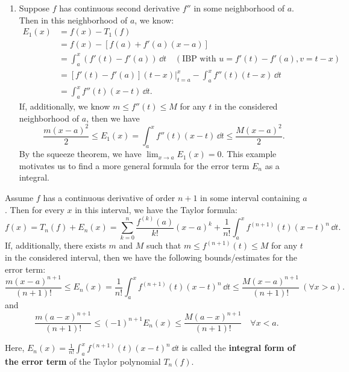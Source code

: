     \begin{exampleenv}
        \begin{enumerate}[label=(\arabic*),start=8]
            \item Suppose $f$ has continuous second derivative $f''$ in some neighborhood of $a$. Then in this neighborhood of $a$, we know:
            \[
            \begin{aligned}
                E_1(x) &= f(x) - T_1(f) \\
                &= f(x) - \left[ f(a) + f'(a)(x-a) \right] \\
                &= \int_a^x (f'(t) - f'(a))\, \dd t\quad (\text{IBP with } u=f'(t)-f'(a),v=t-x ) \\
                &= \left[ f'(t) - f'(a) \right](t-x)\Big|_{t=a}^x - \int_a^x f''(t)(t-x)\, \dd t\\
                &= \int_a^x f''(t)(x-t)\, \dd t.
            \end{aligned}
            \]
            If, additionally, we know $m\le f''(t) \le M$ for any $t$ in the considered neighborhood of $a$, then we have
            \[
            \frac{m(x-a)^2}{2} \le E_1(x) = \int_a^x f''(t)(x-t)\, \dd t \le \frac{M(x-a)^2}{2}.
            \]
            By the squeeze theorem, we have $\displaystyle \lim_{x\to a} E_1(x) = 0$. This example motivates us to find a more general formula for the error term $E_n$ as a integral.
        \end{enumerate}
    \end{exampleenv}
    \begin{theoremenv}\label{Taylor formula with error term}
        Assume $f$ has a continuous derivative of order $n+1$ in some interval containing $a$. Then for every $x$ in this interval, we have the Taylor formula:
        \[
        f(x) = T_n(f) + E_n(x) = \sum_{k=0}^n \frac{f^{(k)}(a)}{k!} (x-a)^k + \frac{1}{n!} \int_a^x f^{(n+1)}(t) (x-t)^n\, \dd t.
        \]
        If, additionally, there exists $m$ and $M$ such that $m \le f^{(n+1)}(t) \le M$ for any $t$ in the considered interval, then we have the following bounds/estimates for the error term:
        \[
        \frac{m(x-a)^{n+1}}{(n+1)!} \le E_n(x) = \frac{1}{n!} \int_a^x f^{(n+1)}(t) (x-t)^n\, \dd t \le \frac{M(x-a)^{n+1}}{(n+1)!} \ (\forall x>a).
        \]
        and
        \[
        \frac{m(a-x)^{n+1}}{(n+1)!} \le (-1)^{n+1} E_n(x)  \le \frac{M(a-x)^{n+1}}{(n+1)!} \quad \forall x<a.
        \]
        \end{theoremenv}
        \begin{remarkenv}
            Here, $\displaystyle E_n(x) = \frac{1}{n!} \int_a^x f^{(n+1)}(t) (x-t)^n\, \dd t$ is called the \textbf{integral form of the error term} of the Taylor polynomial $T_n(f)$.
        \end{remarkenv}
